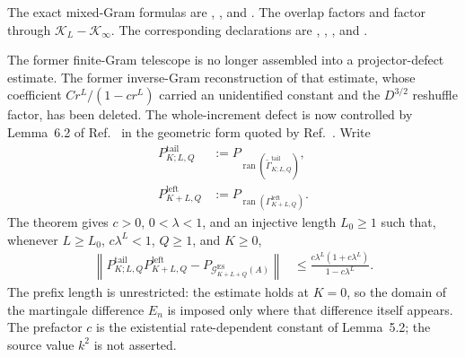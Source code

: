 \documentclass{article}
\begin{document}
\begin{itemize}
          The exact mixed-Gram formulas are
          ,
          ,
          and
          .
          The overlap factors
           and
           factor
           through
          $\mathcal K_L-\mathcal K_\infty$. The corresponding declarations are
          ,
          ,
          ,
          and
          .

          The former finite-Gram telescope is no longer assembled into a projector-defect
          estimate. The former inverse-Gram reconstruction of that estimate, whose
          coefficient $Cr^L/(1-cr^L)$ carried an unidentified constant and the
          $D^{3/2}$ reshuffle factor, has been deleted. The whole-increment defect is
          now controlled by Lemma~6.2 of Ref.~\cite{Fannes1992Finitely} in the
          geometric form quoted by Ref.~\cite{Nachtergaele1996Spectral}. Write
          \begin{align}
              P^{\mathrm{tail}}_{K;L,Q}
               & :=
              P_{\operatorname{ran}
                      (\widetilde\Gamma^{\mathrm{tail}}_{K;L,Q})},
              \label{eq:cpgsv21_martingale_overlap_whole_increment_tail_projector} \\
              P^{\mathrm{left}}_{K+L,Q}
               & :=
              P_{\operatorname{ran}
                      (\Gamma^{\mathrm{left}}_{K+L,Q})}.
              \label{eq:cpgsv21_martingale_overlap_whole_increment_left_projector}
          \end{align}
          The theorem
          gives $c>0$, $0<\lambda<1$, and an injective length $L_0\geq1$ such that,
          whenever $L\geq L_0$, $c\lambda^L<1$, $Q\geq1$, and $K\geq0$,
          \begin{align}
              \left\lVert
              P^{\mathrm{tail}}_{K;L,Q}P^{\mathrm{left}}_{K+L,Q}
              -P_{\mathcal G_{K+L+Q}^{\mathrm{ES}}(A)}
              \right\rVert
               & \leq\frac{c\lambda^L(1+c\lambda^L)}{1-c\lambda^L}.
              \label{eq:cpgsv21_martingale_overlap_whole_increment_defect}
          \end{align}
          The prefix length is unrestricted: the estimate holds at $K=0$, so the
          domain of the martingale difference $E_n$ is imposed only where that
          difference itself appears. The prefactor $c$ is the existential
          rate-dependent constant of Lemma~5.2; the source value $k^2$ is not
          asserted.


\end{itemize}
\end{document}
